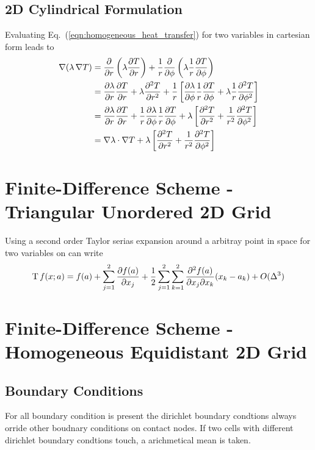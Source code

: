 \subsection{2D Cylindrical Formulation}
Evaluating Eq.~(\ref{eqn:homogeneous_heat_transfer}) for two variables in cartesian form leads to
\begin{align}
    \nabla (\lambda \, \nabla T )  &= \pdv{}{r} \left(\lambda \pdv{T}{r} \right) + \frac{1}{r}\pdv{}{\phi} \left(\lambda \frac{1}{r} \pdv{T}{\phi} \right)  \\
    &= \pdv{\lambda}{r} \pdv{T}{r} + \lambda \pdv[2]{T}{r} + \frac{1}{	r} \left[ \pdv{\lambda}{\phi}\frac{1}{r} \pdv{T}{\phi} + \lambda\frac{1}{r} \pdv[2]{T}{\phi}  \right] \\
    &= \pdv{\lambda}{r} \pdv{T}{r} + \frac{1}{r} \pdv{\lambda}{\phi}\frac{1}{r} \pdv{T}{\phi} + \lambda \left[\pdv[2]{T}{r} + \frac{1}{r^2}\pdv[2]{T}{\phi} \right] \\
    &= \nabla \lambda \cdot \nabla T + \lambda \left[\pdv[2]{T}{r} + \frac{1}{r^2}\pdv[2]{T}{\phi} \right]
\end{align}

\section{Finite-Difference Scheme - Triangular Unordered 2D Grid}
Using a second order Taylor serias expansion around a arbitray point in space for two variables on can write
\begin{equation}
  \mathrm{T} \, f(x ; a) = f(a) + \sum_{j=1}^2 \pdv{f(a)}{x_j} (x_j - a_j) + \frac{1}{2} \sum_{j=1}^2 \sum_{k=1}^2 \pdv{f(a)}{x_j}{x_k} (x_j - a_j) (x_k - a_k) + O(\Delta^3)
\end{equation}


\section{Finite-Difference Scheme - Homogeneous Equidistant 2D Grid}
\subsection{Boundary Conditions}
For all boundary condition is present the dirichlet boundary condtions always orride other boudnary conditions on contact nodes.
If two cells with different dirichlet boundary condtions touch, a arichmetical mean is taken.

